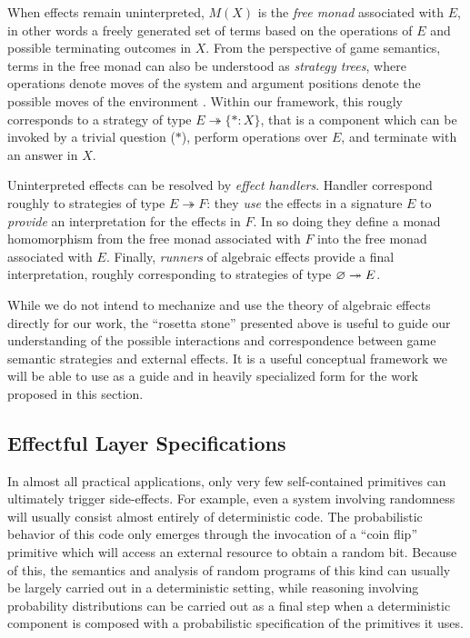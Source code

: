 When effects remain uninterpreted,
$M(X)$ is the \emph{free monad} associated with $E$,
in other words a freely generated set of terms
based on the operations of $E$ and
possible terminating outcomes in $X$.
From the perspective of game semantics,
terms in the free monad can also be understood as
\emph{strategy trees},
where operations denote moves of the system and
argument positions denote the possible moves of the environment \cite{act21}.
Within our framework,
this rougly corresponds to a strategy of type
$E \twoheadrightarrow \{ {*} \mathbin: X \}$,
that is a component which can be invoked by a trivial question ($*$),
perform operations over $E$,
and terminate with an answer in $X$.

Uninterpreted effects can be resolved by \emph{effect handlers}.
Handler correspond roughly to strategies of type $E \twoheadrightarrow F$:
they \emph{use} the effects in a signature $E$
to \emph{provide} an interpretation for the effects in $F$.
In so doing they define a monad homomorphism from
the free monad associated with $F$ into
the free monad associated with $E$.
Finally,
\emph{runners} of algebraic effects
provide a final interpretation,
roughly corresponding to strategies of type $\varnothing \twoheadrightarrow E$.

While we do not intend to mechanize and use
the theory of algebraic effects directly for our work,
the ``rosetta stone'' presented above is useful to guide our understanding
of the possible interactions and correspondence between 
game semantic strategies and
external effects.
It is a useful conceptual framework
we will be able to use as a guide and
in heavily specialized form
for the work proposed in this section.

\subsection{Effectful Layer Specifications} \label{ssec:lspec}

In almost all practical applications,
only very few self-contained primitives
can ultimately trigger side-effects.
For example,
even a system involving randomness
will usually consist almost entirely of deterministic code.
The probabilistic behavior of this code only emerges through
the invocation of a ``coin flip'' primitive
which will access an external resource to obtain a random bit.
Because of this,
the semantics and analysis of random programs of this kind
can usually be largely carried out in a deterministic setting,
while reasoning involving probability distributions
can be carried out as a final step when a deterministic component
is composed with a probabilistic specification
of the primitives it uses.

